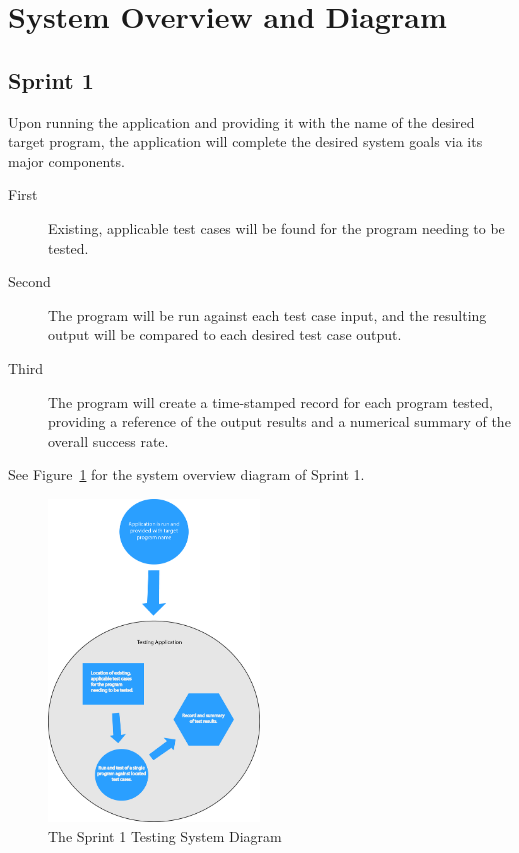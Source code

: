 \section{System Overview and Diagram}

\subsection{Sprint 1}
Upon running the application and providing it with the name of the desired target program, the application
will complete the desired system goals via its major components.
\begin{description}
\item[First      ]Existing, applicable test cases will be found for the program needing to be tested. 
\item[Second]The program will be run against each test case input, and the resulting output will be 
compared to each desired test case output.
\item[Third   ]The program will create a time-stamped record for each program tested, providing a reference of 
the output results and a numerical summary of the overall success rate.
\end{description}  
See Figure~\ref{systemdiagram} for the system overview diagram of Sprint 1.
\begin{figure}[H]
\begin{center}
\includegraphics[width=0.5\textwidth]{./diagram}
\end{center}
\caption{The Sprint 1 Testing System Diagram \label{systemdiagram}}
\end{figure}

